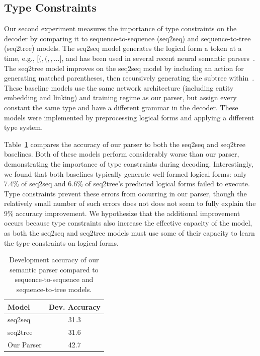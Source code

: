 \subsection{Type Constraints}

Our second experiment measures the importance of type constraints on the decoder
by comparing it to sequence-to-sequence (seq2seq) and sequence-to-tree
(seq2tree) models.  The seq2seq model generates the logical form a token at a
time, e.g., $[ (, (,$$,\ldots]$, and has been used in several
recent neural semantic parsers~\citep{jia2016,dong2016}.  The seq2tree model
improves on the seq2seq model by including an action for generating matched
parentheses, then recursively generating the subtree within~\citep{dong2016}.
These baseline models use the same network architecture (including entity
embedding and linking) and training regime as our parser, but assign every
constant the same type and have a different grammar in the decoder.  These
models were implemented by preprocessing logical forms and applying a different
type system.

Table~\ref{tab:typing_results} compares the accuracy of our parser to both the
seq2seq and seq2tree baselines.  Both of these models perform considerably worse
than our parser, demonstrating the importance of type constraints during
decoding.  Interestingly, we found that both baselines typically generate
well-formed logical forms: only 7.4\% of seq2seq and 6.6\% of seq2tree's
predicted logical forms failed to execute.  Type constraints prevent these
errors from occurring in our parser, though the relatively small number of such
errors does not does not seem to fully explain the 9\% accuracy improvement.  We
hypothesize that the additional improvement occurs because type constraints also
increase the effective capacity of the model, as both the seq2seq and seq2tree
models must use some of their capacity to learn the type constraints on logical
forms.

\begin{table}[]
	\centering
	\begin{tabular}{lc} \toprule
	\textbf{Model} & \textbf{Dev. Accuracy} \\ \midrule
	seq2seq & 31.3 \\
	seq2tree & 31.6 \\
	Our Parser & 42.7 \\ \bottomrule
	\end{tabular}
	\caption{Development accuracy of our semantic parser compared to
	sequence-to-sequence and sequence-to-tree models.}\label{tab:typing_results}
\end{table}


